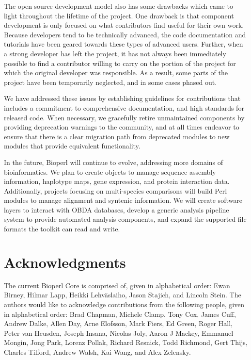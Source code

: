 \documentclass[12pt]{article}
\begin{document}
The open source development model also has some drawbacks which came
to light throughout the lifetime of the project.  One drawback is that
component development is only focused on what contributors find useful
for their own work.  Because developers tend to be technically
advanced, the code documentation and tutorials have been geared
towards these types of advanced users.  Further, when a
strong developer has left the project, it has not always been
immediately possible to find a contributor willing to carry on the
portion of the project for which the original developer was
responsible.  As a result, some parts of the project have been
temporarily neglected, and in some cases phased out.

We have addressed these issues by establishing guidelines for
contributions that includes a commitment to comprehensive
documentation, and high standards for released code.  When necessary,
we gracefully retire unmaintained components by providing deprecation
warnings to the community, and at all times endeavor to ensure that
there is a clear migration path from deprecated modules to new modules
that provide equivalent functionality.


In the future, Bioperl will continue to evolve, addressing more domains
of bioinformatics.  We plan to create objects to manage sequence
assembly information, haplotype maps, gene expression, and protein
interaction data.  Additionally, projects focusing on multi-species
comparisons will build Perl modules to manage alignment and syntenic
information.  We will create software layers to interact with OBDA
databases, develop a generic analysis pipeline system to provide
automated analysis components, and expand the supported file formats
the toolkit can read and write.

\section{Acknowledgments}

The current Bioperl Core is comprised of, given in alphabetical order:
Ewan Birney, Hilmar Lapp, Heikki Lehv\"{a}slaiho, Jason Stajich, and
Lincoln Stein.  The authors would like to acknowledge contributions
from the following people, given in alphabetical order: Brad Chapman,
Michele Clamp, Tony Cox, James Cuff, Andrew Dalke, Allen Day, Arne
Elofsson, Mark Fiers, Ed Green, Roger Hall, Peter van Heusden, Joseph
Insana, Nicolas Joly, Aaron J Mackey, Emmanuel Mongin, Jong Park,
Lorenz Pollak, Richard Resnick, Todd Richmond, Gert Thijs, Charles
Tilford, Andrew Walsh, Kai Wang, and Alex Zelensky.
\end{document}
